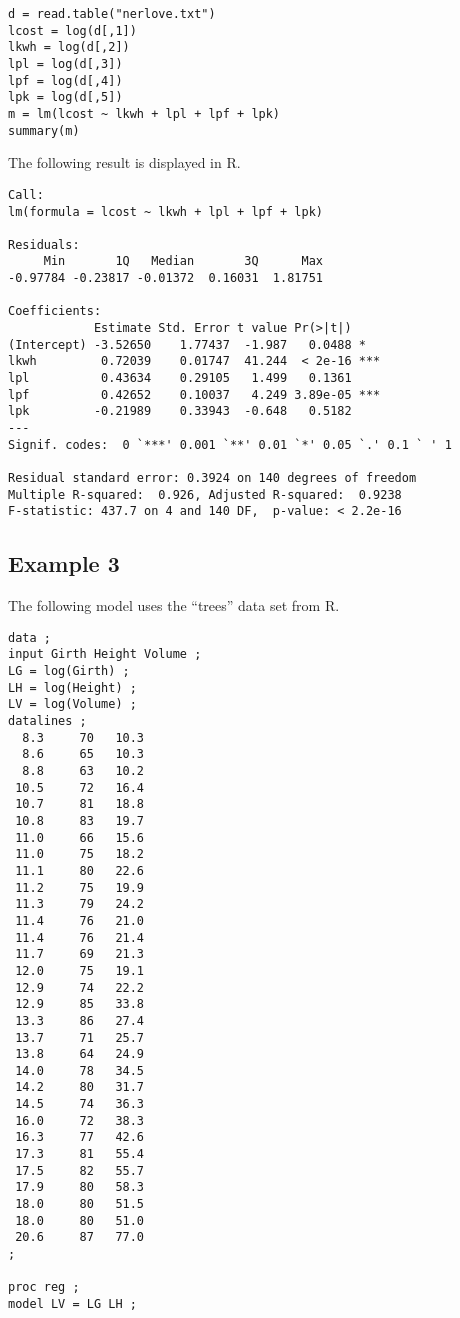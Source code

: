 \documentclass[12pt]{article}
\begin{document}
{\scriptsize\begin{verbatim}
d = read.table("nerlove.txt")
lcost = log(d[,1])
lkwh = log(d[,2])
lpl = log(d[,3])
lpf = log(d[,4])
lpk = log(d[,5])
m = lm(lcost ~ lkwh + lpl + lpf + lpk)
summary(m)
\end{verbatim}}

The following result is displayed in R.

{\scriptsize\begin{verbatim}
Call:
lm(formula = lcost ~ lkwh + lpl + lpf + lpk)

Residuals:
     Min       1Q   Median       3Q      Max 
-0.97784 -0.23817 -0.01372  0.16031  1.81751 

Coefficients:
            Estimate Std. Error t value Pr(>|t|)    
(Intercept) -3.52650    1.77437  -1.987   0.0488 *  
lkwh         0.72039    0.01747  41.244  < 2e-16 ***
lpl          0.43634    0.29105   1.499   0.1361    
lpf          0.42652    0.10037   4.249 3.89e-05 ***
lpk         -0.21989    0.33943  -0.648   0.5182    
---
Signif. codes:  0 `***' 0.001 `**' 0.01 `*' 0.05 `.' 0.1 ` ' 1

Residual standard error: 0.3924 on 140 degrees of freedom
Multiple R-squared:  0.926,	Adjusted R-squared:  0.9238 
F-statistic: 437.7 on 4 and 140 DF,  p-value: < 2.2e-16
\end{verbatim}}

\subsection*{Example 3}

The following model uses the ``trees'' data set from R.

{\scriptsize\begin{verbatim}
data ;
input Girth Height Volume ;
LG = log(Girth) ;
LH = log(Height) ;
LV = log(Volume) ;
datalines ;
  8.3     70   10.3
  8.6     65   10.3
  8.8     63   10.2
 10.5     72   16.4
 10.7     81   18.8
 10.8     83   19.7
 11.0     66   15.6
 11.0     75   18.2
 11.1     80   22.6
 11.2     75   19.9
 11.3     79   24.2
 11.4     76   21.0
 11.4     76   21.4
 11.7     69   21.3
 12.0     75   19.1
 12.9     74   22.2
 12.9     85   33.8
 13.3     86   27.4
 13.7     71   25.7
 13.8     64   24.9
 14.0     78   34.5
 14.2     80   31.7
 14.5     74   36.3
 16.0     72   38.3
 16.3     77   42.6
 17.3     81   55.4
 17.5     82   55.7
 17.9     80   58.3
 18.0     80   51.5
 18.0     80   51.0
 20.6     87   77.0
;

proc reg ;
model LV = LG LH ;
\end{verbatim}}
\end{document}
